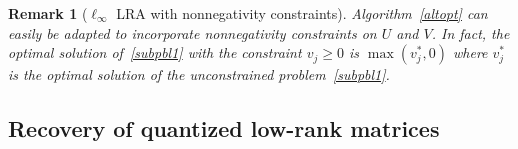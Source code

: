 \documentclass[a4paper,11pt]{article}
\newtheorem{remark}{Remark}
\numberwithin{equation}{section}
\begin{document}


\begin{remark}[$\ell_{\infty}$ LRA with nonnegativity constraints]
Algorithm~\ref{altopt} can easily be adapted to incorporate nonnegativity constraints on $U$ and $V$. In fact, the optimal solution of~\eqref{subpbl1} with the constraint $v_j \geq 0$ is $\max(v_j^*,0)$ where $v_j^*$ is the optimal solution of the unconstrained problem~\eqref{subpbl1}. 
\end{remark}


\subsection{Recovery of quantized low-rank matrices} 

\end{document}
